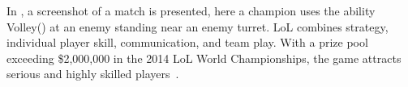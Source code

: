 In , a screenshot of a match is presented, here a champion uses the ability Volley() at an enemy standing near an enemy turret. LoL combines strategy, individual player skill, communication, and team play. With a prize pool exceeding \$2,000,000 in the 2014 LoL World Championships, the game attracts serious and highly skilled players~\cite{lolprize}.



